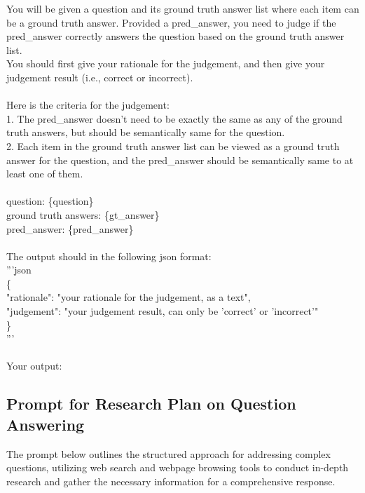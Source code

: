 \documentclass{article}
\begin{document}
\label{emb prompt}
\begin{tcolorbox}[colframe=black, title={Prompt for Model-based Evaluation}]
You will be given a question and its ground truth answer list where each item can be a ground truth answer. Provided a pred\_answer, you need to judge if the pred\_answer correctly answers the question based on the ground truth answer list. \\
You should first give your rationale for the judgement, and then give your judgement result (i.e., correct or incorrect). \\\\
Here is the criteria for the judgement: \\
1. The pred\_answer doesn't need to be exactly the same as any of the ground truth answers, but should be semantically same for the question. \\
2. Each item in the ground truth answer list can be viewed as a ground truth answer for the question, and the pred\_answer should be semantically same to at least one of them. \\\\
question: \{question\} \\
ground truth answers: \{gt\_answer\} \\
pred\_answer: \{pred\_answer\} \\\\
The output should in the following json format: \\
'''json \\
\{ \\
"rationale": "your rationale for the judgement, as a text", \\
"judgement": "your judgement result, can only be 'correct' or 'incorrect'" \\
\} \\
''' \\\\
Your output: 


\end{tcolorbox}




\subsection{Prompt for Research Plan on Question Answering}

The prompt below outlines the structured approach for addressing complex questions, utilizing web search and webpage browsing tools to conduct in-depth research and gather the necessary information for a comprehensive response.
\end{document}
